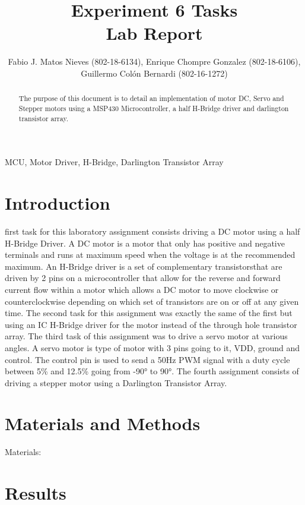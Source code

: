 \documentclass[journal]{IEEEtran}
\begin{document}
\title{Experiment 6 Tasks\\ Lab Report} \author{Fabio J. Matos
  Nieves (802-18-6134), Enrique Chompre Gonzalez (802-18-6106), \\Guillermo Colón Bernardi (802-16-1272)}
\maketitle
\begin{abstract}
  The purpose of this document is to detail an implementation of motor DC, Servo and Stepper motors using a MSP430 Microcontroller, a half H-Bridge driver and darlington transistor array.
\end{abstract}
\begin{IEEEkeywords}
  MCU, Motor Driver, H-Bridge, Darlington Transistor Array
\end{IEEEkeywords}
\IEEEpeerreviewmaketitle
\section{Introduction}
 first task for this laboratory assignment consists driving a DC motor using a half H-Bridge Driver. A DC motor is a motor that only has positive and negative terminals and runs at maximum speed when the voltage is at the recommended maximum. An H-Bridge driver is a set of complementary transistorsthat are driven by 2 pins on a microcontroller that allow for the reverse and forward current flow within a motor which allows a DC motor to move clockwise or counterclockwise depending on which set of transistors are on or off at any given time. The second task for this assignment was exactly the same of the first but using an IC H-Bridge driver for the motor instead of the through hole transistor array. The third task of this assignment was to drive a servo motor at various angles. A servo motor is type of motor with 3 pins going to it, VDD, ground and control. The control pin is used to send a 50\si{\Hz} PWM signal with a duty cycle between 5\% and 12.5\% going from \ang{-90} to \ang{90}. The fourth assignment consists of driving a stepper motor using a Darlington Transistor Array.
\section{Materials and Methods}
Materials:
\section{Results}
\nocite{rojasEmbeddedSystemsDesign2016}
\nocite{LCDControllerDatasheets}


\end{document}
